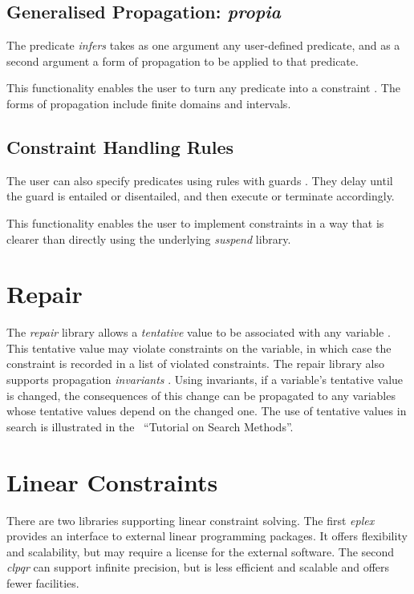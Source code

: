 \subsection{Generalised Propagation: {\em propia}}
The predicate {\em infers} takes as one argument
any user-defined predicate, and as a second argument a form of
propagation to be applied to that predicate.

This functionality enables the user to turn any predicate into a
constraint \cite{LeProvost93b}. The forms of propagation include finite
domains and intervals.

\subsection{Constraint Handling Rules}
The user can also specify predicates using rules with guards
\cite{Fruehwirth}.  
They delay until the guard is entailed or disentailed, and then
execute or terminate accordingly. 

This functionality enables the user to implement constraints in a way
that is clearer than directly using the underlying {\em suspend}
library.

\section{Repair}
The {\em repair} library allows a {\em tentative} value to be
associated with any variable \cite{cp99wkshoptalk}.
This tentative value may violate constraints on the variable, in which
case the constraint is recorded in a list of violated constraints.
The repair library also supports propagation {\em invariants}
\cite{Localizer}.
Using invariants,  if a variable's tentative
value is changed, the consequences of this change can be propagated to
any variables whose tentative values depend on the changed one.
The use of tentative values in search is illustrated in the \eclipse\ 
``Tutorial on Search Methods''.
 
\section{Linear Constraints}
There are two libraries supporting linear constraint solving.  The
first {\em eplex} provides an interface to external linear
programming packages.  
It offers flexibility and scalability, but may
require a license for the external software.
The second {\em clpqr} can support infinite precision, but is less
efficient and scalable and offers fewer facilities.

